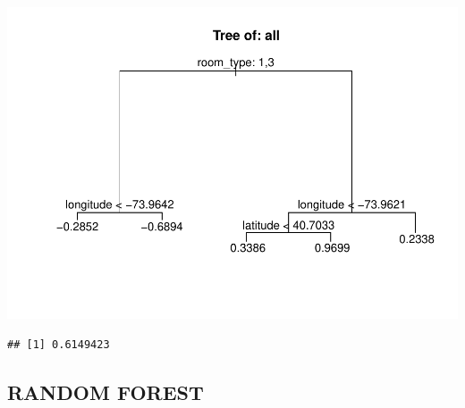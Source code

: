 \documentclass[
]{article}
\newenvironment{Shaded}{\begin{snugshade}}{\end{snugshade}}
\newcommand{\NormalTok}[1]{#1}
\newcommand{\OperatorTok}[1]{\textcolor[rgb]{0.81,0.36,0.00}{\textbf{#1}}}
\newcommand{\StringTok}[1]{\textcolor[rgb]{0.31,0.60,0.02}{#1}}
\begin{document}
\includegraphics{project-code_files/figure-latex/unnamed-chunk-14-20.pdf}

\begin{verbatim}
## [1] 0.6149423
\end{verbatim}

\begin{Shaded}
\end{Shaded}

\hypertarget{random-forest}{%
\subsection{RANDOM FOREST}\label{random-forest}}
\end{document}
